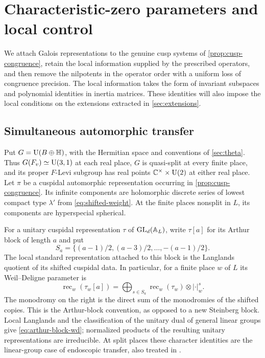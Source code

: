 \section{Characteristic-zero parameters and local control}
\label{sec:parameters}

We attach Galois representations to the genuine cusp systems of
\cref{prop:cusp-congruence}, retain the local information supplied
by the prescribed operators, and then remove the nilpotents in the
operator order with a uniform loss of congruence precision.
The local information takes the form of invariant subspaces and
polynomial identities in inertia matrices.  These identities will
also impose the local conditions on the extensions extracted in
\cref{sec:extensions}.

\subsection{Simultaneous automorphic transfer}
\label{subsec:simultaneous-transfer}

Put $G=\operatorname{U}(B\oplus\mathbb H)$, with the Hermitian space and conventions of
\cref{sec:theta}.  Thus $G(F_v)\simeq\operatorname{U}(3,1)$ at each real place,
$G$ is quasi-split at every finite place, and its proper $F$-Levi subgroup
has real points $\mathbb C^\times\times\operatorname{U}(2)$ at either real place.
Let $\pi$ be a cuspidal automorphic representation occurring in
\cref{prop:cusp-congruence}.  Its infinite components are holomorphic
discrete series of lowest compact type $\lambda'$ from
\cref{eq:shifted-weight}.  At the finite places nonsplit in $L$, its
components are hyperspecial spherical.

For a unitary cuspidal representation $\tau$ of $\operatorname{GL}_d(\mathbb A_L)$, write
$\tau[a]$ for its Arthur block of length $a$ and put
\[
 S_a=\{(a-1)/2,(a-3)/2,\ldots,-(a-1)/2\}.
\]
The local standard representation attached to this block is the
Langlands quotient of its shifted cuspidal data.  In particular, for a
finite place $w$ of $L$ its Weil--Deligne parameter is
\begin{equation}
 \operatorname{rec}_w(\tau_w[a])
   =\bigoplus_{s\in S_a}
        \operatorname{rec}_w(\tau_w)\otimes|\cdot|_w^s.
 \label{eq:arthur-block-wd}
\end{equation}
The monodromy on the right is the direct sum of the monodromies of the
shifted copies.  This is the Arthur-block convention, as opposed to a
new Steinberg block.  Local Langlands and the classification of the
unitary dual of general linear groups give
\cref{eq:arthur-block-wd}; normalized products of the resulting unitary
representations are irreducible.  At split places these character
identities are the linear-group case of endoscopic transfer, also
treated in \citet[Section~1.6.3]{KMSW2014}.

